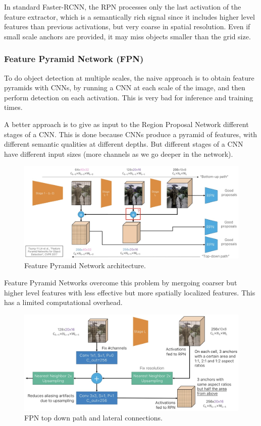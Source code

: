 In standard Faster-RCNN, the RPN processes only the last activation of the feature extractor, which is a semantically rich signal since it includes higher level features than previous activations, but very coarse in spatial resolution.
Even if small scale anchors are provided, it may miss objects smaller than the grid size.

\subsubsection{Feature Pyramid Network (FPN)}
To do object detection at multiple scales, the naive approach is to obtain feature pyramids with CNNs, by running a CNN at each scale of the image, and then perform detection on each activation.
This is very bad for inference and training times.

A better approach is to give as input to the Region Proposal Network different stages of a CNN.
This is done because CNNs produce a pyramid of features, with different semantic qualities at different depths.
But different stages of a CNN have different input sizes (more channels as we go deeper in the network).

\begin{figure}[htbp]
  \centering
  \includegraphics[width=0.6\linewidth]{./img/fpn.jpg}
  \caption{Feature Pyramid Network architecture.}
\end{figure}

Feature Pyramid Networks overcome this problem by mergoing coarser but higher level features with less effective but more spatially localized features.
This has a limited computational overhead.

\begin{figure}[htbp]
  \centering
  \includegraphics[width=0.6\linewidth]{./img/fpnsum.jpg}
  \caption{FPN top down path and lateral connections.}
  \label{fig:fpnsum}
\end{figure}

